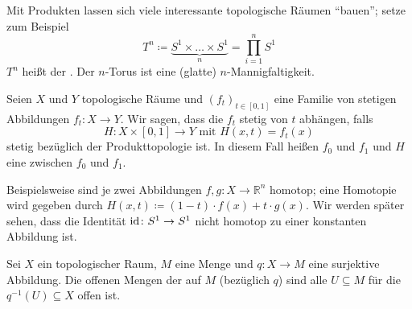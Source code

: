 \begin{beispiel}[{name=[Torus]}]
	Mit Produkten lassen sich viele interessante topologische Räumen \enquote{bauen}; setze zum Beispiel
	\[
		T^n \coloneqq \underbrace{S^1 \times \ldots \times S^1}_{n} = \prod_{i=1}^n S^1
	\]
	$T^n$ heißt der . Der $n$-Torus ist eine (glatte) $n$-Mannigfaltigkeit.
	\begin{figure}[hbt]
	\end{figure}
\end{beispiel}

\begin{definition}[{name=[Homotopie]}]
	Seien $X$ und $Y$ topologische Räume und $(f_t)_{t \in [0,1]}$ eine Familie von stetigen Abbildungen $f_t \colon X \to Y$. 
	Wir sagen, dass die $f_t$ stetig von $t$ abhängen, falls 
	\[
		H \colon X \times [0,1] \longrightarrow Y \text{ mit } H(x,t) = f_t(x)
	\]
	stetig bezüglich der Produkttopologie ist. 
	In diesem Fall heißen $f_0$ und $f_1$  und $H$ eine  zwischen $f_0$ und $f_1$.
\end{definition}

Beispielsweise sind je zwei Abbildungen $f,g \colon X \to \mathbb{R}^n$ homotop; eine Homotopie wird gegeben durch $H(x,t) \coloneqq (1-t)\cdot f(x) + t \cdot g(x)$. 
Wir werden später sehen, dass die Identität $\operatorname{id} \colon S^1 \to S^1$ nicht homotop zu einer konstanten Abbildung ist.

\begin{definition}[{name=[Quotiententopologie]}]
	Sei $X$ ein topologischer Raum, $M$ eine Menge und $q \colon X \to M$ eine surjektive Abbildung. 
	Die offenen Mengen der  auf $M$ (bezüglich $q$) sind alle $U \subseteq M$ für die $q^{-1} (U ) \subseteq X$ offen ist.
\end{definition}

